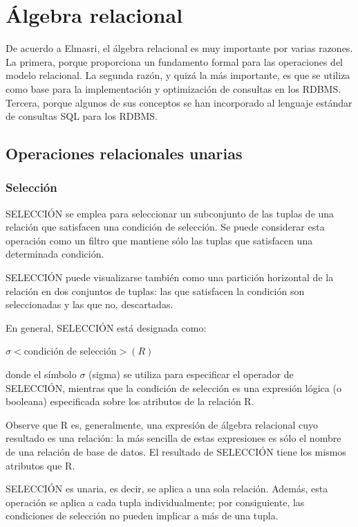 \section{Álgebra relacional}
De acuerdo a Elmasri\cite{ramez_elmasri_fundamentos_nodate}, el álgebra relacional es muy importante por varias razones. La primera, porque proporciona un fundamento formal para las operaciones del modelo relacional. La segunda razón, y quizá la más importante, es que se utiliza como base para la implementación y optimización de consultas en los RDBMS. Tercera, porque algunos de sus conceptos se han incorporado al lenguaje estándar de consultas SQL para los RDBMS.


\subsection*{Operaciones relacionales unarias}
\subsubsection*{Selección}

SELECCIÓN se emplea para seleccionar un subconjunto de las tuplas de una relación que satisfacen una condición de selección. Se puede considerar esta operación como un filtro que mantiene sólo las tuplas que satisfacen una determinada condición. 


SELECCIÓN puede visualizarse también como una partición horizontal de la relación en dos conjuntos de tuplas: las que satisfacen la condición son seleccionadas y las que no, descartadas. 


En general, SELECCIÓN está designada como:


$\sigma<$condición de selección$>(R)$


donde el símbolo $\sigma$ (sigma) se utiliza para especificar el operador de SELECCIÓN, mientras que la condición de selección es una expresión lógica (o booleana) especificada sobre los atributos de la relación R. 


Observe que R es, generalmente, una expresión de álgebra relacional cuyo resultado es una relación: la más sencilla de estas expresiones es sólo el nombre de una relación de base de datos. El resultado de SELECCIÓN tiene los mismos atributos que R.


SELECCIÓN es unaria, es decir, se aplica a una sola relación. Además, esta operación se aplica a cada tupla individualmente; por consiguiente, las condiciones de selección no pueden implicar a más de una tupla. 


